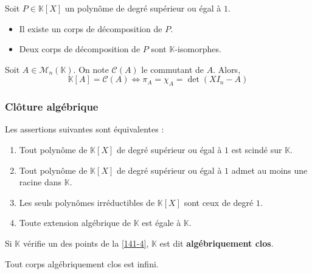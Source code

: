   \begin{theorem}
    Soit $P \in \mathbb{K}[X]$ un polynôme de degré supérieur ou égal à $1$.
    \begin{itemize}
      \item Il existe un corps de décomposition de $P$.
      \item Deux corps de décomposition de $P$ sont $\mathbb{K}$-isomorphes.
    \end{itemize}
  \end{theorem}


  \begin{application}
    Soit $A \in \mathcal{M}_n(\mathbb{K})$. On note $\mathcal{C}(A)$ le commutant de $A$. Alors,
    \[ \mathbb{K}[A] = \mathcal{C}(A) \iff \pi_A = \chi_A = \det(XI_n - A) \]
  \end{application}

  \subsubsection{Clôture algébrique}


  \begin{proposition}
    \label{141-4}
    Les assertions suivantes sont équivalentes :
    \begin{enumerate}[label=(\roman*)]
      \item Tout polynôme de $\mathbb{K}[X]$ de degré supérieur ou égal à $1$ est scindé sur $\mathbb{K}$.
      \item Tout polynôme de $\mathbb{K}[X]$ de degré supérieur ou égal à $1$ admet au moins une racine dans $\mathbb{K}$.
      \item Les seuls polynômes irréductibles de $\mathbb{K}[X]$ sont ceux de degré $1$.
      \item Toute extension algébrique de $\mathbb{K}$ est égale à $\mathbb{K}$.
    \end{enumerate}
  \end{proposition}

  \begin{definition}
    Si $\mathbb{K}$ vérifie un des points de la \cref{141-4}, $\mathbb{K}$ est dit \textbf{algébriquement clos}.
  \end{definition}

  \begin{proposition}
    Tout corps algébriquement clos est infini.
  \end{proposition}

